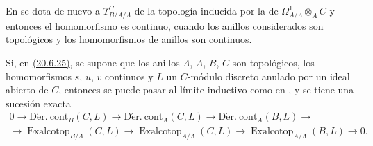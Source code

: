\begin{env}[20.7.12]
\label{0.20.7.12-fr}
En  se dota de nuevo a $\Upsilon^C_{B/A/\Lambda}$ de la
topología inducida por la de $\Omega^1_{A/\Lambda}\otimes_A C$ y entonces
el homomorfismo  es continuo, cuando los anillos
considerados son topológicos y los homomorfismos de anillos son continuos.
\end{env}

\begin{env}[20.7.13]
\label{0.20.7.13-fr}
Si, en \hyperref[0.20.6.23-fr]{\textup{(20.6.25)}}, se supone que los anillos $\Lambda$, $A$, $B$,
$C$ son topológicos, los homomorfismos $s$, $u$, $v$ continuos y $L$ un
$C$-módulo discreto anulado por un ideal abierto de $C$, entonces se puede pasar
al límite inductivo como en , y se tiene una sucesión exacta
\begin{equation}
\tag{20.7.13.1}
\label{0.20.7.13.1-fr}
\begin{split}
  0\to\operatorname{D\acute{e}r.\ cont}_B(C,L)\to
  \operatorname{D\acute{e}r.\ cont}_A(C,L)\to
  \operatorname{D\acute{e}r.\ cont}_A(B,L)\to \\
  \to\operatorname{Exalcotop}_{B/\Lambda}(C,L)\to
  \operatorname{Exalcotop}_{A/\Lambda}(C,L)\to
  \operatorname{Exalcotop}_{A/\Lambda}(B,L)\to0.
\end{split}
\end{equation}
\end{env}

